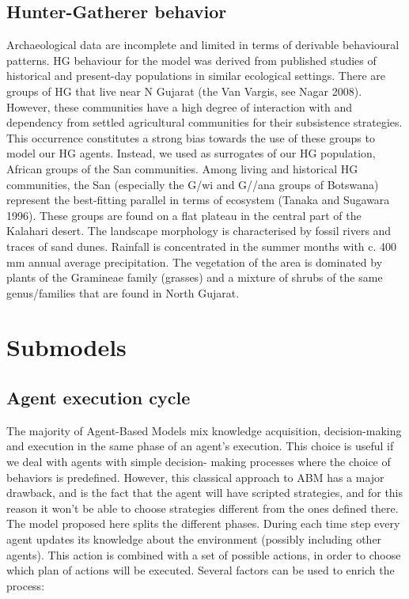 \documentclass[11pt,oneside,a4paper,openright]{report}
\begin{document}


\subsection{Hunter-Gatherer behavior}
Archaeological data are incomplete and limited in terms of derivable behavioural patterns. HG
behaviour for the model was derived from published studies of historical and present-day populations
in similar ecological settings. There are groups of HG that live near N Gujarat (the Van Vargis, see
Nagar 2008). However, these communities have a high degree of interaction with and dependency
from settled agricultural communities for their subsistence strategies. This occurrence constitutes a
strong bias towards the use of these groups to model our HG agents. Instead, we used as surrogates
of our HG population, African groups of the San communities.
Among living and historical HG communities, the San (especially the G/wi and G//ana groups of
Botswana) represent the best-fitting parallel in terms of ecosystem (Tanaka and Sugawara 1996).
These groups are found on a flat plateau in the central part of the Kalahari desert. The landscape
morphology is characterised by fossil rivers and traces of sand dunes. Rainfall is concentrated in the
summer months with c. 400 mm annual average precipitation. The vegetation of the area is dominated
by plants of the Gramineae family (grasses) and a mixture of shrubs of the same genus/families that
are found in North Gujarat.


\section{Submodels}

\subsection{Agent execution cycle}
The majority of Agent-Based Models mix knowledge acquisition, decision-making and execution in the
same phase of an agent's execution. This choice is useful if we deal with agents with simple decision-
making processes where the choice of behaviors is predefined. However, this classical approach to
ABM has a major drawback, and is the fact that the agent will have scripted strategies, and for this
reason it won't be able to choose strategies different from the ones defined there.
The model proposed here splits the different phases. During each time step every agent updates its
knowledge about the environment (possibly including other agents). This action is combined with a set
of possible actions, in order to choose which plan of actions will be executed. Several factors can be
used to enrich the process:
\end{document}
